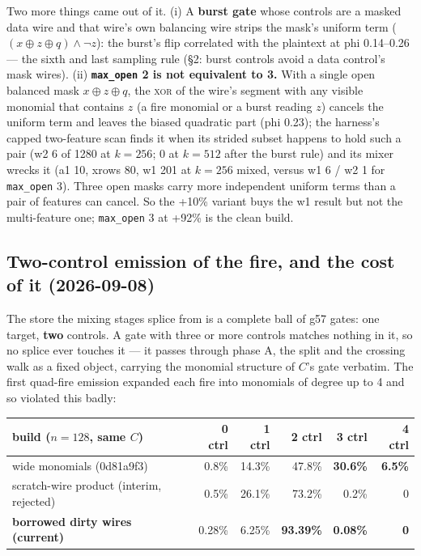 \documentclass[11pt]{article}
\newcommand{\g}{\textsf{g57}}
\newcommand{\doc}[1]{\texttt{#1}}
\newcommand{\xor}{\oplus}
\begin{document}
Two more things came out of it. (i) A \textbf{burst gate} whose controls are a
masked data wire and that wire's own balancing wire strips the mask's uniform
term ($(x \xor z \xor q) \wedge \neg z$): the burst's flip correlated with the
plaintext at phi 0.14--0.26 --- the sixth and last sampling rule (\S2: burst
controls avoid a data control's mask wires). (ii) \textbf{\doc{max\_open} 2 is not
equivalent to 3.} With a single open balanced mask $x \xor z \xor q$, the
\textsc{xor} of the wire's segment with any visible monomial that contains $z$ (a
fire monomial or a burst reading $z$) cancels the uniform term and leaves the
biased quadratic part (phi 0.23); the harness's capped two-feature scan finds it
when its strided subset happens to hold such a pair (w2 6 of 1280 at $k=256$; 0 at
$k=512$ after the burst rule) and its mixer wrecks it (a1 10, xrows 80, w1 201 at
$k=256$ mixed, versus w1 6 / w2 1 for \doc{max\_open} 3). Three open masks carry
more independent uniform terms than a pair of features can cancel. So the +10\%
variant buys the w1 result but not the multi-feature one; \doc{max\_open} 3 at
+92\% is the clean build.

\subsection{Two-control emission of the fire, and the cost of it (2026-09-08)}

The store the mixing stages splice from is a complete ball of \g{} gates: one target,
\textbf{two} controls. A gate with three or more controls matches nothing in it, so no splice
ever touches it --- it passes through phase A, the split and the crossing walk as a fixed
object, carrying the monomial structure of $C$'s gate verbatim. The first quad-fire emission
expanded each fire into monomials of degree up to 4 and so violated this badly:

\begin{center}\small
\begin{tabular}{@{}lrrrrr@{}}\toprule
build ($n=128$, same $C$) & 0 ctrl & 1 ctrl & 2 ctrl & 3 ctrl & 4 ctrl\\\midrule
wide monomials (0d81a9f3) & 0.8\% & 14.3\% & 47.8\% & \textbf{30.6\%} & \textbf{6.5\%}\\
scratch-wire product (interim, rejected) & 0.5\% & 26.1\% & 73.2\% & 0.2\% & 0\\
\textbf{borrowed dirty wires (current)} & 0.28\% & 6.25\% & \textbf{93.39\%} & \textbf{0.08\%} & \textbf{0}\\
\bottomrule\end{tabular}
\end{center}
\end{document}
